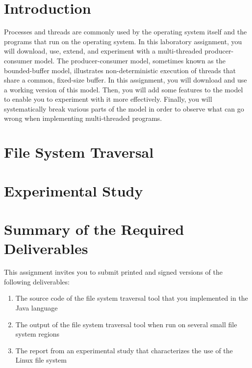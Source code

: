 

\usepackage[compact]{titlesec}



\section*{Introduction}

Processes and threads are commonly used by the operating system itself and the programs that run on the operating system.  In this
laboratory assignment, you will download, use, extend, and experiment with a multi-threaded producer-consumer model.  The
producer-consumer model, sometimes known as the bounded-buffer model, illustrates non-deterministic execution of threads that
share a common, fixed-size buffer.  In this assignment, you will download and use a working version of this model.  Then, you will
add some features to the model to enable you to experiment with it more effectively.  Finally, you will systematically break
various parts of the model in order to observe what can go wrong when implementing multi-threaded programs.

\section*{File System Traversal}

\section*{Experimental Study}

\section*{Summary of the Required Deliverables}

This assignment invites you to submit printed and signed versions of the following deliverables: 

  \begin{enumerate}
    \item The source code of the file system traversal tool that you implemented in the Java language
    \item The output of the file system traversal tool when run on several small file system regions
    \item The report from an experimental study that characterizes the use of the Linux file system
  \end{enumerate}

